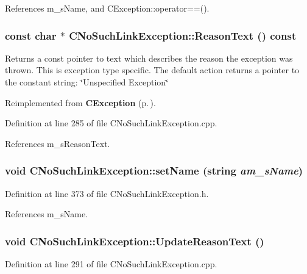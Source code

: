 References m\_\-s\-Name, and CException::operator==().
\subsubsection{\setlength{\rightskip}{0pt plus 5cm}const char $\ast$ CNo\-Such\-Link\-Exception::Reason\-Text () const\hspace{0.3cm}{\tt  [virtual]}}\label{classCNoSuchLinkException_a12}


Returns a const pointer to text which describes the reason the exception was thrown. This is exception type specific. The default action returns a pointer to the constant string: \char`\"{}Unspecified Exception\char`\"{} 

Reimplemented from {\bf CException} {\rm (p.\,\pageref{classCException_a8})}.

Definition at line 285 of file CNo\-Such\-Link\-Exception.cpp.

References m\_\-s\-Reason\-Text.
\subsubsection{\setlength{\rightskip}{0pt plus 5cm}void CNo\-Such\-Link\-Exception::set\-Name (string {\em am\_\-s\-Name})\hspace{0.3cm}{\tt  [inline]}}\label{classCNoSuchLinkException_a11}




Definition at line 373 of file CNo\-Such\-Link\-Exception.h.

References m\_\-s\-Name.
\subsubsection{\setlength{\rightskip}{0pt plus 5cm}void CNo\-Such\-Link\-Exception::Update\-Reason\-Text ()\hspace{0.3cm}{\tt  [protected]}}\label{classCNoSuchLinkException_b0}




Definition at line 291 of file CNo\-Such\-Link\-Exception.cpp.


